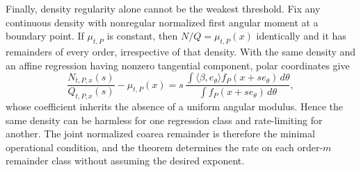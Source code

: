Finally, density regularity alone cannot be the weakest threshold.  Fix any continuous density with nonregular normalized first angular moment at a boundary point.  If \(\mu_{t,P}\) is constant, then \(N/Q=\mu_{t,P}(x)\) identically and it has remainders of every order, irrespective of that density.  With the same density and an affine regression having nonzero tangential component, polar coordinates give
\[
 \frac{N_{t,P,x}(s)}{Q_{t,P,x}(s)}-\mu_{t,P}(x)
 =s\,\frac{\int \langle\beta,e_\theta\rangle f_P(x+se_\theta)\,d\theta}{\int f_P(x+se_\theta)\,d\theta},
\]
whose coefficient inherits the absence of a uniform angular modulus.  Hence the same density can be harmless for one regression class and rate-limiting for another.  The joint normalized coarea remainder is therefore the minimal operational condition, and the theorem determines the rate on each order-\(m\) remainder class without assuming the desired exponent.